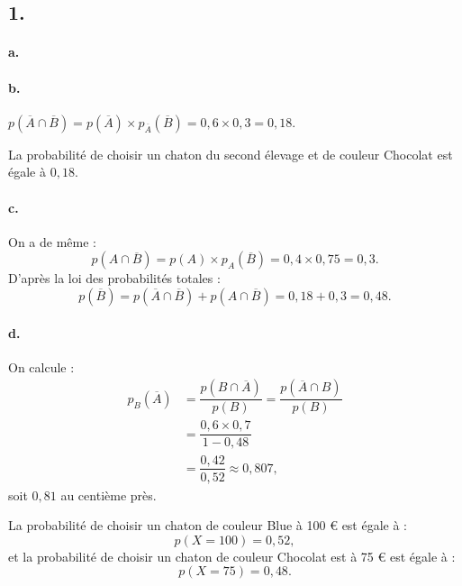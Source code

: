 \subsection*{1.}

\paragraph{a.}

\begin{center}
\end{center}

\paragraph{b.} \(p(\overline{A} \cap \overline{B}) = p(\overline{A}) \times p_{\overline{A}}(\overline{B}) = 0{,}6 \times 0{,}3 = 0{,}18\).

La probabilité de choisir un chaton du second élevage et de couleur Chocolat est égale à \(0{,}18\).

\paragraph{c.} On a de même :
\[
p(A \cap \overline{B}) = p(A) \times p_A(\overline{B}) = 0{,}4 \times 0{,}75 = 0{,}3.
\]
D'après la loi des probabilités totales :
\[
p(\overline{B}) = p(\overline{A} \cap \overline{B}) + p(A \cap \overline{B}) = 0{,}18 + 0{,}3 = 0{,}48.
\]

\paragraph{d.} On calcule :
\begin{align*}
p_B(\overline{A}) &= \dfrac{p(B \cap \overline{A})}{p(B)} = \dfrac{p(\overline{A} \cap B)}{p(B)} \\
&= \dfrac{0{,}6 \times 0{,}7}{1 - 0{,}48} \\
&= \dfrac{0{,}42}{0{,}52} \approx 0{,}807,
\end{align*}
soit \(0{,}81\) au centième près.

La probabilité de choisir un chaton de couleur Blue à 100 € est égale à :
\[
p(X = 100) = 0{,}52,
\]
et la probabilité de choisir un chaton de couleur Chocolat est à 75 € est égale à :
\[
p(X = 75) = 0{,}48.
\]
